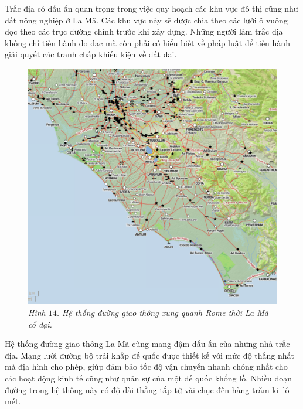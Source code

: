 \begin{multicols}{2}
	Trắc địa có dấu ấn quan trọng trong việc quy hoạch các khu vực đô thị cũng như đất nông nghiệp ở La Mã. Các khu vực này sẽ được chia theo các lưới ô vuông dọc theo các trục đường chính trước khi xây dựng. Những người làm trắc địa không chỉ tiến hành đo đạc mà còn phải có hiểu biết về pháp luật để tiến hành giải quyết các tranh chấp khiếu kiện về đất đai.
	\begin{figure}[H]
		\vspace*{-5pt}
		\centering
		\captionsetup{labelformat= empty, justification=centering}
		\includegraphics[height= 0.65\linewidth]{14}
		\caption{\small\textit{\color{toanhocdoisong}Hình $14$. Hệ thống đường giao thông xung quanh Rome thời La Mã cổ đại.}}
		\vspace*{-10pt}
	\end{figure}
	Hệ thống đường giao thông La Mã cũng mang đậm dấu ấn của những nhà trắc địa. Mạng lưới đường bộ trải khắp đế quốc được thiết kế với mức độ thẳng nhất mà địa hình cho phép, giúp đảm bảo tốc độ vận chuyển nhanh chóng nhất cho các hoạt động kinh tế cũng như quân sự của một đế quốc khổng lồ. Nhiều đoạn đường trong hệ thống này có độ dài thẳng tắp từ vài chục đến hàng trăm ki--lô--mét.
	

\end{multicols}
